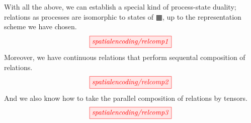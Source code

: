 \begin{construction}
With all the above, we can establish a special kind of process-state duality; relations as processes are isomorphic to states of $\squarehvfill$, up to the representation scheme we have chosen.
\[\scalebox{1}{\tikzfig{spatialencoding/relcomp1}}\]
Moreover, we have continuous relations that perform sequental composition of relations.
\[\scalebox{1}{\tikzfig{spatialencoding/relcomp2}}\]
And we also know how to take the parallel composition of relations by tensors.
\[\scalebox{1}{\tikzfig{spatialencoding/relcomp3}}\]
\end{construction}